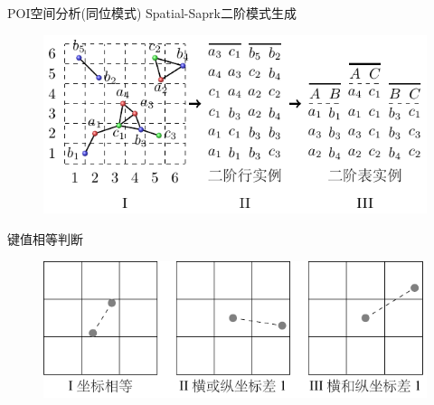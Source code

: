 \begin{frame}[t]{POI空间分析(同位模式)}
    Spatial-Saprk二阶模式生成

    \vspace{1em}
    \begin{figure}
        \centering
        \includegraphics[scale=0.6]{figures/two_order.pdf}
    \end{figure}
    

    \pause
    键值相等判断
    \begin{figure}
        \centering
        \includegraphics[scale=0.5]{figures/keyequal.pdf}
    \end{figure}
  
\end{frame}


